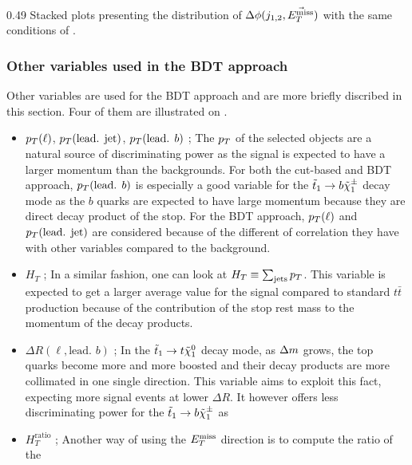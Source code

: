                      {0.49}
                     {Stacked plots presenting the distribution of $\Delta \phi( j_{1,2}, \vec{E_T^\text{miss}} )$
                     with the same conditions of .}

        \subsubsection{Other variables used in the BDT approach}

        Other variables are used for the BDT approach and are more briefly discribed in
        this section. Four of them are illustrated on .

    \begin{itemize}
        \item $p_T(\ell)$, $p_T(\text{lead. jet})$, $p_T(\text{lead. } b)$ ; The $p_T$ of the
            selected objects are a natural source of discriminating power as the signal is expected
            to have a larger momentum than the backgrounds. For both the cut-based and BDT approach,
            $p_T(\text{lead. } b)$ is especially a good variable for the $\tilde{t}_1 \rightarrow b \tilde{\chi}_1^\pm$
            decay mode as the $b$ quarks are expected to have large momentum because they are direct
            decay product of the stop. For the BDT approach, $p_T(\ell)$ and $p_T(\text{lead. jet})$
            are considered because of the different of correlation they have with other variables
            compared to the background.
        \item $H_T$ ; In a similar fashion, one can look at $H_T \equiv \sum_{\text{jets}} p_T$.
            This variable is expected to get a larger average value for the signal compared to standard
            $t\bar{t}$ production because of the contribution of the stop rest mass to the momentum of
            the decay products.
        \item $\Delta R( \ell, \text{lead. } b)$ ; In the $\tilde{t}_1 \rightarrow t \tilde{\chi}_1^0$ decay mode,
            as $\Delta m$ grows, the top quarks become more and more boosted and their decay products are
            more collimated in one single direction. This variable aims to exploit this fact, expecting more
            signal events at lower $\Delta R$. It however offers less discriminating
            power for the $\tilde{t}_1 \rightarrow b \tilde{\chi}_1^\pm$ as
        \item $H_{T}^\text{ratio}$ ; Another way of using the $E_T^\text{miss}$ direction is to compute the ratio of the

\end{itemize}
